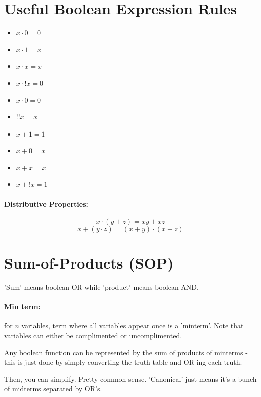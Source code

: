 \documentclass[a4paper,12pt]{report}
\begin{document}
\section{Useful Boolean Expression Rules}
\begin{itemize}
\item $x \cdot 0 = 0$
\item $x \cdot 1 = x$
\item $x \cdot x = x$
\item $x \cdot !x = 0$
\item $x \cdot 0 = 0$
\item $!!x = x$
\item $x + 1 = 1$
\item $x + 0 = x$
\item $x + x = x$
\item $x + !x = 1$
\end{itemize}

\paragraph{Distributive Properties: }
$$x \cdot (y + z) = xy + xz$$
$$x + (y \cdot z) = (x+y) \cdot (x+z)$$



\section{Sum-of-Products (SOP)}
'Sum' means boolean OR while 'product' means boolean AND. 

\paragraph{Min term: } for $n$ variables, term where all variables appear once is a 'minterm'.
Note that variables can either be complimented or uncomplimented. 

Any boolean function can be represented by the sum of products of minterms - this is just done 
by simply converting the truth table and OR-ing each truth. 

Then, you can simplify. Pretty common sense. 'Canonical' just means it's a bunch of midterms
separated by OR's.
\end{document}

